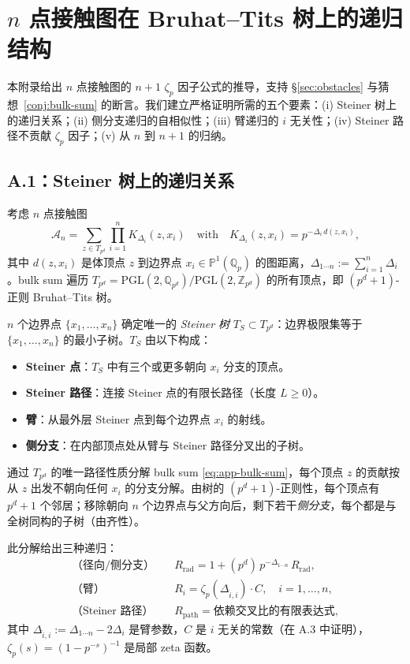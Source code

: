 \documentclass[11pt,a4paper]{ctexart}
\theoremstyle{remark}
\newcommand{\Qp}{\mathbb{Q}_p}
\newcommand{\Pone}{\mathbb{P}^1}
\newcommand{\PGL}{\mathrm{PGL}}
\newcommand{\BirTits}{Bruhat--Tits}
\begin{document}
\section{$n$ 点接触图在 \BirTits{} 树上的递归结构}
\label{app:recursion}

本附录给出 $n$ 点接触图的 $n{+}1$ $\zeta_p$ 因子公式的推导，支持 \S\ref{sec:obstacles} 与猜想~\ref{conj:bulk-sum} 的断言。我们建立严格证明所需的五个要素：(i) Steiner 树上的递归关系；(ii) 侧分支递归的自相似性；(iii) 臂递归的 $i$ 无关性；(iv) Steiner 路径不贡献 $\zeta_p$ 因子；(v) 从 $n$ 到 $n{+}1$ 的归纳。

\subsection{A.1：Steiner 树上的递归关系}

考虑 $n$ 点接触图
\begin{equation}
\label{eq:app-bulk-sum}
\mathcal{A}_n = \sum_{z \in T_{p^d}} \prod_{i=1}^n K_{\Delta_i}(z, x_i)
\quad\text{with}\quad
K_{\Delta_i}(z, x_i) = p^{-\Delta_i \, d(z, x_i)},
\end{equation}
其中 $d(z, x_i)$ 是体顶点 $z$ 到边界点 $x_i \in \Pone(\Qp)$ 的图距离，$\Delta_{1\cdots n} := \sum_{i=1}^n \Delta_i$。bulk sum 遍历 $T_{p^d} = \PGL(2, \mathbb{Q}_{p^d})/\PGL(2, \mathbb{Z}_{p^d})$ 的所有顶点，即 $(p^d{+}1)$-正则 \BirTits{} 树。

$n$ 个边界点 $\{x_1, \ldots, x_n\}$ 确定唯一的 \emph{Steiner 树} $T_S \subset T_{p^d}$：边界极限集等于 $\{x_1, \ldots, x_n\}$ 的最小子树。$T_S$ 由以下构成：
\begin{itemize}[leftmargin=2em]
    \item \textbf{Steiner 点}：$T_S$ 中有三个或更多朝向 $x_i$ 分支的顶点。
    \item \textbf{Steiner 路径}：连接 Steiner 点的有限长路径（长度 $L \geq 0$）。
    \item \textbf{臂}：从最外层 Steiner 点到每个边界点 $x_i$ 的射线。
    \item \textbf{侧分支}：在内部顶点处从臂与 Steiner 路径分叉出的子树。
\end{itemize}

通过 $T_{p^d}$ 的唯一路径性质分解 bulk sum \eqref{eq:app-bulk-sum}，每个顶点 $z$ 的贡献按从 $z$ 出发不朝向任何 $x_i$ 的分支分解。由树的 $(p^d{+}1)$-正则性，每个顶点有 $p^d{+}1$ 个邻居；移除朝向 $n$ 个边界点与父方向后，剩下若干\emph{侧分支}，每个都是与全树同构的子树（由齐性）。

此分解给出三种递归：
\begin{align}
\text{（径向/侧分支）}\quad & R_{\mathrm{rad}} = 1 + (p^d) \, p^{-\Delta_{1\cdots n}} \, R_{\mathrm{rad}}, \label{eq:rec-rad}\\
\text{（臂）}\quad & R_i = \zeta_p(\Delta_{\hat{i},i}) \cdot C, \quad i = 1, \ldots, n, \label{eq:rec-arm}\\
\text{（Steiner 路径）}\quad & R_{\mathrm{path}} = \text{依赖交叉比的有限表达式}, \label{eq:rec-path}
\end{align}
其中 $\Delta_{\hat{i},i} := \Delta_{1\cdots n} - 2\Delta_i$ 是臂参数，$C$ 是 $i$ 无关的常数（在 A.3 中证明），$\zeta_p(s) = (1 - p^{-s})^{-1}$ 是局部 zeta 函数。
\end{document}
